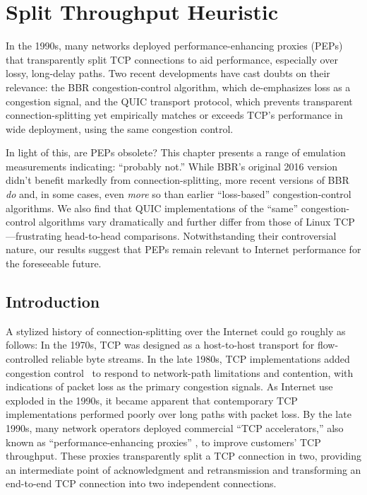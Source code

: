 \chapter{Split Throughput Heuristic}
\label{sec:splitting}

In the 1990s, many networks deployed performance-enhancing proxies
(PEPs) that transparently split TCP connections to aid performance,
especially over lossy, long-delay paths. Two recent
developments have cast doubts on their relevance: the
BBR congestion-control algorithm, which de-emphasizes loss as a
congestion signal, and the QUIC transport protocol, which prevents
transparent connection-splitting yet empirically matches or exceeds
TCP's performance in wide deployment, using the same congestion control.

In light of this, are PEPs obsolete? This chapter presents a range of
emulation measurements indicating: ``probably not.'' While BBR's
original 2016 version didn't benefit markedly from connection-splitting, more
recent versions of BBR \textit{do} and, in some cases, even \textit{more} so
than earlier ``loss-based'' congestion-control algorithms.  We also find that
QUIC implementations of the ``same'' congestion-control algorithms vary
dramatically and further differ from those of Linux TCP---frustrating
head-to-head comparisons.
Notwithstanding their controversial nature, our results suggest
that PEPs remain relevant to Internet performance for the foreseeable future.

\section{Introduction}
\label{sec:splitting:intro}



A stylized history of connection-splitting over the Internet could go
roughly as follows: In the 1970s, TCP was designed as a host-to-host
transport for flow-controlled reliable byte streams. In the late
1980s, TCP implementations added congestion control~\cite{vjk} to
respond to network-path limitations and contention, with indications
of packet loss as the primary congestion signals. As Internet use
exploded in the 1990s, it became apparent that contemporary TCP
implementations performed poorly over long paths with packet loss. By
the late 1990s, many network operators deployed commercial ``TCP
accelerators,'' also known as ``performance-enhancing proxies''
\cite{rfc3135, honda2011still}, to improve customers' TCP
throughput. These proxies transparently split a TCP connection in two,
providing an intermediate point of acknowledgment and retransmission
and transforming an end-to-end TCP connection into two independent
connections.

